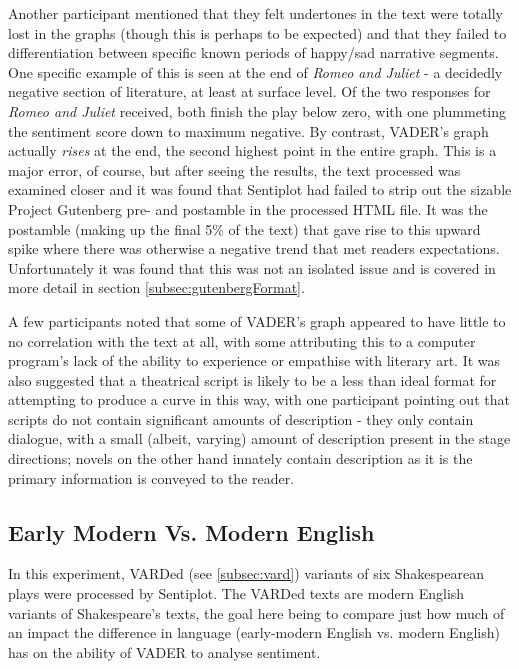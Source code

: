 \documentclass{article}
\begin{document}
{                Another participant mentioned that they felt undertones in the text were totally lost in the graphs (though this is perhaps to be expected) and that they failed to differentiation between specific known periods of happy/sad narrative segments. One specific example of this is seen at the end of \textit{Romeo and Juliet} - a decidedly negative section of literature, at least at surface level. Of the two responses for \textit{Romeo and Juliet} received, both finish the play below zero, with one plummeting the sentiment score down to maximum negative. By contrast, VADER's graph actually \textit{rises} at the end, the second highest point in the entire graph. This is a major error, of course, but after seeing the results, the text processed was examined closer and it was found that Sentiplot had failed to strip out the sizable Project Gutenberg pre- and postamble in the processed HTML file. It was the postamble (making up the final 5\% of the text) that gave rise to this upward spike where there was otherwise a negative trend that met readers expectations. Unfortunately it was found that this was not an isolated issue and is covered in more detail in section \ref{subsec:gutenbergFormat}.
                
                A few participants noted that some of VADER's graph appeared to have little to no correlation with the text at all, with some attributing this to a computer program's lack of the ability to experience or empathise with literary art. It was also suggested that a theatrical script is likely to be a less than ideal format for attempting to produce a curve in this way, with one participant pointing out that scripts do not contain significant amounts of description - they only contain dialogue, with a small (albeit, varying) amount of description present in the stage directions; novels on the other hand innately contain description as it is the primary information is conveyed to the reader.
    \subsection{Early Modern Vs. Modern English}
    \label{subsec:EMvME}
        In this experiment, VARDed (see \ref{subsec:vard}) variants of six Shakespearean plays were processed by Sentiplot. The VARDed texts are modern English variants of Shakespeare's texts, the goal here being to compare just how much of an impact the difference in language (early-modern English vs. modern English) has on the ability of VADER to analyse sentiment.

}
\end{document}
